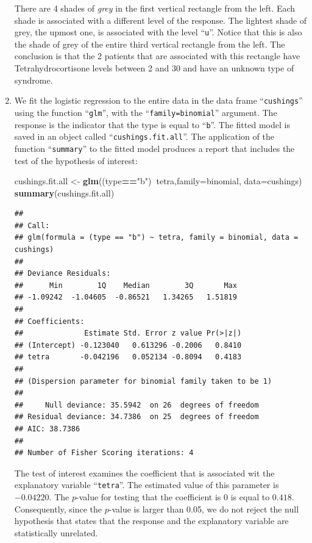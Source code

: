 \documentclass[]{krantz}
\makeatletter
\newenvironment{Shaded}{\begin{snugshade}}{\end{snugshade}}
\newcommand{\KeywordTok}[1]{\textcolor[rgb]{0.13,0.29,0.53}{\textbf{#1}}}
\newcommand{\DataTypeTok}[1]{\textcolor[rgb]{0.13,0.29,0.53}{#1}}
\newcommand{\StringTok}[1]{\textcolor[rgb]{0.31,0.60,0.02}{#1}}
\newcommand{\OperatorTok}[1]{\textcolor[rgb]{0.81,0.36,0.00}{\textbf{#1}}}
\newcommand{\NormalTok}[1]{#1}
\newenvironment{kframe}{%
\medskip{}
\setlength{\fboxsep}{.8em}
 \def\at@end@of@kframe{}%
 \ifinner\ifhmode%
  \def\at@end@of@kframe{\end{minipage}}%
  \begin{minipage}{\columnwidth}%
 \fi\fi%
 \def\FrameCommand##1{\hskip\@totalleftmargin \hskip-\fboxsep
 \colorbox{shadecolor}{##1}\hskip-\fboxsep
     \hskip-\linewidth \hskip-\@totalleftmargin \hskip\columnwidth}%
 \MakeFramed {\advance\hsize-\width
   \@totalleftmargin\z@ \linewidth\hsize
   \@setminipage}}%
 {\par\unskip\endMakeFramed%
 \at@end@of@kframe}
\renewenvironment{Shaded}{\begin{kframe}}{\end{kframe}}
\theoremstyle{definition}
\theoremstyle{definition}
\theoremstyle{definition}
\theoremstyle{remark}
\makeatother
\begin{document}
\begin{enumerate}
  There are 4 shades of \emph{grey} in the first vertical rectangle from
  the left. Each shade is associated with a different level of the
  response. The lightest shade of grey, the upmost one, is associated
  with the level ``\texttt{u}''. Notice that this is also the shade of
  grey of the entire third vertical rectangle from the left. The
  conclusion is that the 2 patients that are associated with this
  rectangle have Tetrahydrocortisone levels between 2 and 30 and have an
  unknown type of syndrome.
\item
  We fit the logistic regression to the entire data in the data frame
  ``\texttt{cushings}'' using the function ``\texttt{glm}'', with the
  ``\texttt{family=binomial}'' argument. The response is the indicator
  that the type is equal to ``\texttt{b}''. The fitted model is saved in
  an object called ``\texttt{cushings.fit.all}''. The application of the
  function ``\texttt{summary}'' to the fitted model produces a report
  that includes the test of the hypothesis of interest:

\begin{Shaded}
\begin{Highlighting}[]
\NormalTok{cushings.fit.all <-}\StringTok{ }\KeywordTok{glm}\NormalTok{((type}\OperatorTok{==}\StringTok{"b"}\NormalTok{)}\OperatorTok{~}\NormalTok{tetra,}\DataTypeTok{family=}\NormalTok{binomial, }\DataTypeTok{data=}\NormalTok{cushings)}
\KeywordTok{summary}\NormalTok{(cushings.fit.all)}
\end{Highlighting}
\end{Shaded}

\begin{verbatim}
## 
## Call:
## glm(formula = (type == "b") ~ tetra, family = binomial, data = cushings)
## 
## Deviance Residuals: 
##      Min        1Q    Median        3Q       Max  
## -1.09242  -1.04605  -0.86521   1.34265   1.51819  
## 
## Coefficients:
##              Estimate Std. Error z value Pr(>|z|)
## (Intercept) -0.123040   0.613296 -0.2006   0.8410
## tetra       -0.042196   0.052134 -0.8094   0.4183
## 
## (Dispersion parameter for binomial family taken to be 1)
## 
##     Null deviance: 35.5942  on 26  degrees of freedom
## Residual deviance: 34.7386  on 25  degrees of freedom
## AIC: 38.7386
## 
## Number of Fisher Scoring iterations: 4
\end{verbatim}

  The test of interest examines the coefficient that is associated wit
  the explanatory variable ``\texttt{tetra}''. The estimated value of
  this parameter is \(-0.04220\). The \(p\)-value for testing that the
  coefficient is 0 is equal to \(0.418\). Consequently, since the
  \(p\)-value is larger than 0.05, we do not reject the null hypothesis
  that states that the response and the explanatory variable are
  statistically unrelated.


\end{enumerate}
\end{document}
